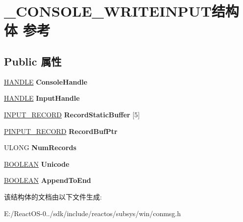 \hypertarget{struct___c_o_n_s_o_l_e___w_r_i_t_e_i_n_p_u_t}{}\section{\+\_\+\+C\+O\+N\+S\+O\+L\+E\+\_\+\+W\+R\+I\+T\+E\+I\+N\+P\+U\+T结构体 参考}
\label{struct___c_o_n_s_o_l_e___w_r_i_t_e_i_n_p_u_t}
\subsection*{Public 属性}
\begin{DoxyCompactItemize}
\item 
\mbox{\label{struct___c_o_n_s_o_l_e___w_r_i_t_e_i_n_p_u_t_afa479af85575c8705f862422a66fc5f0}} 
\hyperlink{interfacevoid}{H\+A\+N\+D\+LE} {\bfseries Console\+Handle}
\item 
\mbox{\label{struct___c_o_n_s_o_l_e___w_r_i_t_e_i_n_p_u_t_a945761dac2bede1b4fbef8efaeba1210}} 
\hyperlink{interfacevoid}{H\+A\+N\+D\+LE} {\bfseries Input\+Handle}
\item 
\mbox{\label{struct___c_o_n_s_o_l_e___w_r_i_t_e_i_n_p_u_t_af373bfe1e25a7480d93967cc5f8d6eb0}} 
\hyperlink{struct___i_n_p_u_t___r_e_c_o_r_d}{I\+N\+P\+U\+T\+\_\+\+R\+E\+C\+O\+RD} {\bfseries Record\+Static\+Buffer} \mbox{[}5\mbox{]}
\item 
\mbox{\label{struct___c_o_n_s_o_l_e___w_r_i_t_e_i_n_p_u_t_a7b3cb143bfdcb9ec82a67aebbad8e482}} 
\hyperlink{struct___i_n_p_u_t___r_e_c_o_r_d}{P\+I\+N\+P\+U\+T\+\_\+\+R\+E\+C\+O\+RD} {\bfseries Record\+Buf\+Ptr}
\item 
\mbox{\label{struct___c_o_n_s_o_l_e___w_r_i_t_e_i_n_p_u_t_ae2bbc1998b97bcd939279f7976acebe6}} 
U\+L\+O\+NG {\bfseries Num\+Records}
\item 
\mbox{\label{struct___c_o_n_s_o_l_e___w_r_i_t_e_i_n_p_u_t_acbdc52d3ad538a81a4c98ad02c216918}} 
\hyperlink{_processor_bind_8h_a112e3146cb38b6ee95e64d85842e380a}{B\+O\+O\+L\+E\+AN} {\bfseries Unicode}
\item 
\mbox{\label{struct___c_o_n_s_o_l_e___w_r_i_t_e_i_n_p_u_t_a522448f3d46c80d0d32a5337ea9e1c11}} 
\hyperlink{_processor_bind_8h_a112e3146cb38b6ee95e64d85842e380a}{B\+O\+O\+L\+E\+AN} {\bfseries Append\+To\+End}
\end{DoxyCompactItemize}


该结构体的文档由以下文件生成\+:\begin{DoxyCompactItemize}
\item 
E\+:/\+React\+O\+S-\/0../sdk/include/reactos/subsys/win/conmsg.\+h\end{DoxyCompactItemize}
